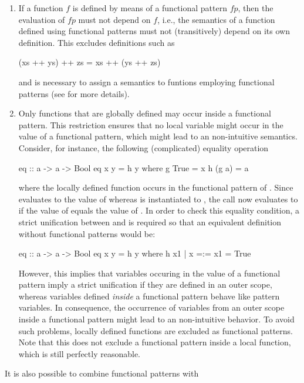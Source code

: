 \begin{enumerate}

\item
If a function $f$ is defined by means of a functional pattern $fp$,
then the evaluation of $fp$ must not depend on $f$, i.e.,
the semantics of a function defined using functional patterns
must not (transitively) depend on its own definition.
This excludes definitions such as
\begin{curry}
(xs ++ ys) ++ zs = xs ++ (ys ++ zs)
\end{curry}
and is necessary to assign a semantics to funtions employing functional patterns
(see \cite{AntoyHanus05LOPSTR} for more details).

\item
Only functions that are globally defined may occur inside a functional pattern.
This restriction ensures that no local variable
might occur in the value of a functional pattern,
which might lead to an non-intuitive semantics.
Consider, for instance, the following (complicated) equality operation
\begin{curry}
eq :: a -> a -> Bool
eq x y = h y
 where
  g True  = x
  h (g a) = a
\end{curry}
where the locally defined function  occurs in the functional
pattern  of .
Since  evaluates to the value of  whereas 
is instantiated to , the call  now evaluates to 
if the value of  equals the value of .
In order to check this equality condition,
a strict unification between  and  is required
so that an equivalent definition without functional patterns would be:
\begin{curry}
eq :: a -> a -> Bool
eq x y = h y
 where
  h x1 | x =:= x1 = True
\end{curry}
However, this implies that variables occuring in the value
of a functional pattern imply a strict unification
if they are defined in an outer scope,
whereas variables defined \emph{inside} a functional pattern
behave like pattern variables.
In consequence, the occurrence of variables from an outer scope
inside a functional pattern might lead to an non-intuitive behavior.
To avoid such problems, locally defined functions are excluded
as functional patterns.
Note that this does not exclude a functional pattern inside a local function,
which is still perfectly reasonable.
\end{enumerate}
%
It is also possible to combine functional patterns with
